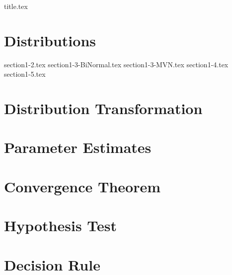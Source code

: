 \documentclass[a4paper,11pt]{book}
\theoremstyle{plain}
\theoremstyle{definition}
\theoremstyle{remark}
\numberwithin{equation}{section}
\begin{document}
\frontmatter
{title.tex}

\clearpage

\tableofcontents

\mainmatter

\chapter{Distributions}

{section1-2.tex}
\clearpage
{section1-3-BiNormal.tex}
\clearpage
{section1-3-MVN.tex}
\clearpage
{section1-4.tex}
\clearpage
{section1-5.tex}

\chapter{Distribution Transformation}


\chapter{Parameter Estimates}


\clearpage


\chapter{Convergence Theorem}


\clearpage

\clearpage

\clearpage

\clearpage


\chapter{Hypothesis Test}


\clearpage


\chapter{Decision Rule}

\clearpage

\clearpage
\backmatter
\end{document}
